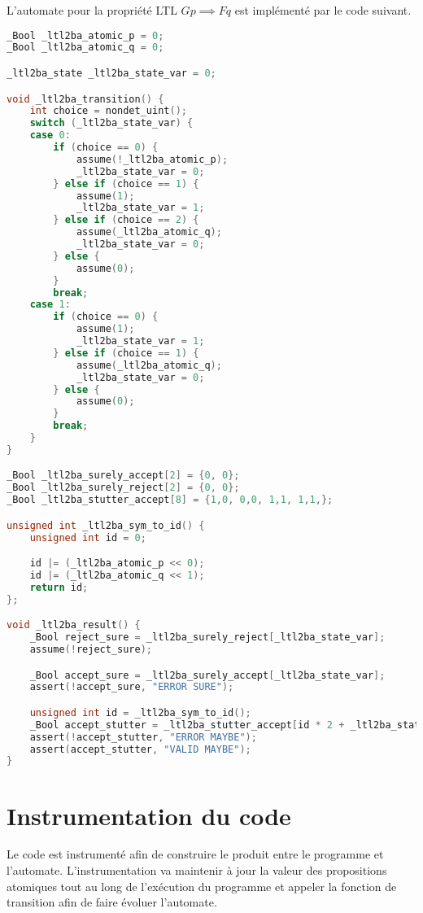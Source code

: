 L'automate pour la propriété LTL \(G p \implies F q\) est implémenté par
le code suivant.

\begin{lstlisting}[language=C]
_Bool _ltl2ba_atomic_p = 0;
_Bool _ltl2ba_atomic_q = 0;

_ltl2ba_state _ltl2ba_state_var = 0;

void _ltl2ba_transition() {
    int choice = nondet_uint();
    switch (_ltl2ba_state_var) {
    case 0:
        if (choice == 0) {
            assume(!_ltl2ba_atomic_p);
            _ltl2ba_state_var = 0;
        } else if (choice == 1) {
            assume(1);
            _ltl2ba_state_var = 1;
        } else if (choice == 2) {
            assume(_ltl2ba_atomic_q);
            _ltl2ba_state_var = 0;
        } else {
            assume(0);
        }
        break;
    case 1:
        if (choice == 0) {
            assume(1);
            _ltl2ba_state_var = 1;
        } else if (choice == 1) {
            assume(_ltl2ba_atomic_q);
            _ltl2ba_state_var = 0;
        } else {
            assume(0);
        }
        break;
    }
}

_Bool _ltl2ba_surely_accept[2] = {0, 0};
_Bool _ltl2ba_surely_reject[2] = {0, 0};
_Bool _ltl2ba_stutter_accept[8] = {1,0, 0,0, 1,1, 1,1,};

unsigned int _ltl2ba_sym_to_id() {
    unsigned int id = 0;

    id |= (_ltl2ba_atomic_p << 0);
    id |= (_ltl2ba_atomic_q << 1);
    return id;
};

void _ltl2ba_result() {
    _Bool reject_sure = _ltl2ba_surely_reject[_ltl2ba_state_var];
    assume(!reject_sure);

    _Bool accept_sure = _ltl2ba_surely_accept[_ltl2ba_state_var];
    assert(!accept_sure, "ERROR SURE");

    unsigned int id = _ltl2ba_sym_to_id();
    _Bool accept_stutter = _ltl2ba_stutter_accept[id * 2 + _ltl2ba_state_var];
    assert(!accept_stutter, "ERROR MAYBE");
    assert(accept_stutter, "VALID MAYBE");
}
\end{lstlisting}

\section{Instrumentation du code}

Le code est instrumenté afin de construire le produit entre le programme
et l'automate. L'instrumentation va maintenir à jour la valeur des
propositions atomiques tout au long de l'exécution du programme et
appeler la fonction de transition afin de faire évoluer l'automate.

